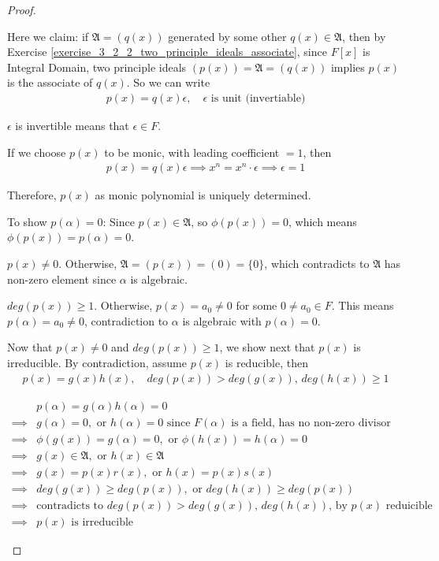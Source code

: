 \documentclass[utf8]{ctexbook}
\theoremstyle{definition}
\begin{document}
\begin{proof}
\begin{enumerate}
{Here we claim: if $\mathfrak{A} = (q(x))$ generated by some other $q(x) \in \mathfrak{A}$, then by Exercise \ref{exercise_3_2_2_two_principle_ideals_associate}, since $F[x]$ is Integral Domain, two principle ideals $(p(x)) = \mathfrak{A} = (q(x))$ implies $p(x)$ is the associate of $q(x)$. So we can write
\begin{align*}
p(x) = q(x) \epsilon, \quad \epsilon \mbox{ is unit (invertiable)}
\end{align*}

$\epsilon$ is invertible means that $\epsilon \in F$. 

If we choose $p(x)$ to be monic, with leading coefficient $=1$, then
\begin{align*}
p(x) = q(x) \epsilon \implies x^n = x^n \cdot \epsilon \implies \epsilon = 1
\end{align*}

Therefore, $p(x)$ as monic polynomial is uniquely determined.

To show $p(\alpha) = 0$: Since $p(x) \in \mathfrak{A}$, so $\phi(p(x)) = 0$, which means $\phi(p(x)) = p(\alpha) = 0$.

$p(x) \neq 0$. Otherwise, $\mathfrak{A}= (p(x)) = (0) = \{ 0\}$, which contradicts to $\mathfrak{A}$ has non-zero element since $\alpha$ is algebraic.

$deg(p(x)) \geq 1$. Otherwise, $p(x) = a_0 \neq 0$ for some $0 \neq a_0 \in F$. This means $ p(\alpha) = a_0 \neq 0$, contradiction to $\alpha$ is algebraic with $p(\alpha) =0 $.

Now that $p(x) \neq 0 $ and $deg(p(x)) \geq 1$, we show next that $p(x)$ is irreducible. By contradiction, assume $p(x)$ is reducible, then
\begin{align*}
p(x) = g(x) h(x), \quad deg(p(x)) > deg(g(x)),\, deg(h(x)) \geq 1
\end{align*}

\begin{align*}
& p(\alpha) = g(\alpha) h(\alpha) = 0 \\
\implies & g(\alpha)=0, \mbox{ or } h(\alpha) = 0 \mbox{ since $F(\alpha)$ is a field, has no non-zero divisor}\\
\implies & \phi(g(x)) = g(\alpha) =0 , \mbox{ or } \phi(h(x)) =h(\alpha) = 0 \\
\implies & g(x) \in \mathfrak{A}, \mbox{ or } h(x) \in \mathfrak{A} \\
\implies & g(x) = p(x) r(x), \mbox{ or } h(x) = p(x) s(x) \\
\implies & deg(g(x)) \geq deg(p(x)), \mbox{ or } deg(h(x)) \geq deg(p(x)) \\
\implies & \mbox{contradicts to } deg(p(x)) > deg(g(x)),\, deg(h(x)) \mbox{, by $p(x)$ reduicible} \\
\implies & p(x) \mbox{ is irreducible}
\end{align*}

}
\end{enumerate}
\end{proof}
\end{document}
